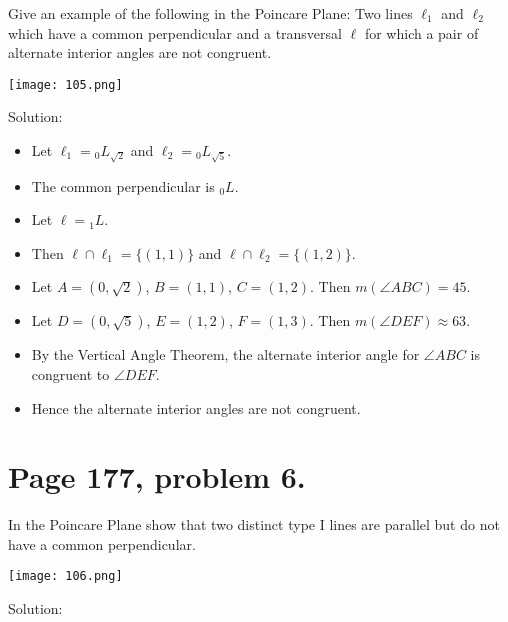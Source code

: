 \documentclass[12pt,openany]{report}
\begin{document}
Give an example of the following in the Poincare Plane:
Two lines $\ell_1$ and $\ell_2$ which have a common perpendicular
and a transversal $\ell$ for which a pair of alternate interior
angles are not congruent.

\bigskip
\noindent
\texttt{[image: 105.png]}

\bigskip
\noindent
Solution:

\begin{itemize}

\item[]
Let $\ell_1={}_0L_{\sqrt2}$ and $\ell_2={}_0L_{\sqrt5}$.

\item[]
The common perpendicular is ${}_0L$.

\item[]
Let $\ell={}_1L$.

\item[]
Then $\ell\cap\ell_1=\{(1,1)\}$ and $\ell\cap\ell_2=\{(1,2)\}$.

\item[]
Let $A=(0,\sqrt2)$, $B=(1,1)$, $C=(1,2)$.
Then $m(\angle ABC)=45$.

\item[]
Let $D=(0,\sqrt5)$, $E=(1,2)$, $F=(1,3)$.
Then $m(\angle DEF)\approx63$.

\item[]
By the Vertical Angle Theorem, the alternate interior angle
for $\angle ABC$ is congruent to $\angle DEF$.

\item[]
Hence the alternate interior angles are not congruent.

\end{itemize}

\newpage

\section*{Page 177, problem 6.}

In the Poincare Plane show that two distinct type I lines are parallel
but do not have a common perpendicular.

\noindent
\texttt{[image: 106.png]}

\noindent
Solution:
\end{document}
